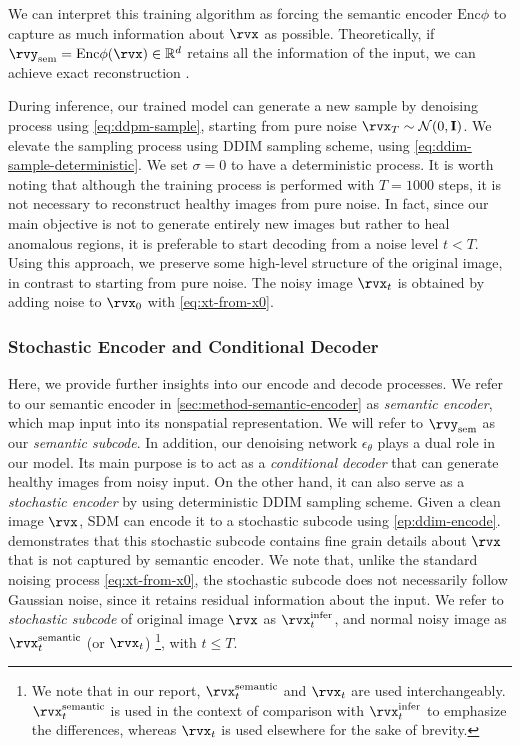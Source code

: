 We can interpret this training algorithm as forcing the semantic encoder $\mathrm{Enc}\phi$ to capture as much information about $\rvx$ as possible. Theoretically, if $\rvy_{\text{sem}} = \mathrm{Enc}\phi(\rvx) \in \mathbb{R}^d$ retains all the information of the input, we can achieve exact reconstruction \cite{lozuponeLDAE2025}. 

During inference, our trained model can generate a new sample by denoising process using \cref{eq:ddpm-sample}, starting from pure noise $\rvx_T \sim \mathcal{N}(0, \mathbf{I})$. We elevate the sampling process using DDIM sampling scheme, using \cref{eq:ddim-sample-deterministic}. We set $\sigma=0$ to have a deterministic process. It is worth noting that although the training process is performed with $T = 1000$ steps, it is not necessary to reconstruct healthy images from pure noise. In fact, since our main objective is not to generate entirely new images but rather to heal anomalous regions, it is preferable to start decoding from a noise level $t < T$. Using this approach, we preserve some high-level structure of the original image, in contrast to starting from pure noise. The noisy image $\rvx_t$ is obtained by adding noise to $\rvx_0$ with \cref{eq:xt-from-x0}.

\subsubsection{Stochastic Encoder and Conditional Decoder}

Here, we provide further insights into our encode and decode processes. We refer to our semantic encoder in \cref{sec:method-semantic-encoder} as \emph{semantic encoder}, which map input into its nonspatial representation. We will refer to $\rvy_{\text{sem}}$ as our \emph{semantic subcode}. In addition, our denoising network $\epsilon_\theta$ plays a dual role in our model. Its main purpose is to act as a \emph{conditional decoder} that can generate healthy images from noisy input. On the other hand, it can also serve as a \emph{stochastic encoder} by using deterministic DDIM sampling scheme. Given a clean image $\rvx$, SDM can encode it to a stochastic subcode using \cref{ep:ddim-encode}. \cite{DiffAE, lozuponeLDAE2025} demonstrates that this stochastic subcode contains fine grain details about $\rvx$ that is not captured by semantic encoder. We note that, unlike the standard noising process \cref{eq:xt-from-x0}, the stochastic subcode does not necessarily follow Gaussian noise, since it retains residual information about the input. We refer to \emph{stochastic subcode} of original image $\rvx$ as $\rvx_t^{\mathrm{infer}}$, and normal noisy image as $\rvx_t^{\textrm{semantic}}$ (or $\rvx_t$) \footnote{We note that in our report, $\rvx_t^{\text{semantic}}$ and $\rvx_t$ are used interchangeably. $\rvx_t^{\text{semantic}}$ is used in the context of comparison with $\rvx_t^{\text{infer}}$ to emphasize the differences, whereas $\rvx_t$ is used elsewhere for the sake of brevity.}, with $t \leq T$. 


